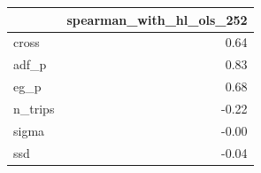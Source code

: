 \begin{tabular}{lr}
\toprule
 & spearman_with_hl_ols_252 \\
\midrule
cross & 0.64 \\
adf_p & 0.83 \\
eg_p & 0.68 \\
n_trips & -0.22 \\
sigma & -0.00 \\
ssd & -0.04 \\
\bottomrule
\end{tabular}

